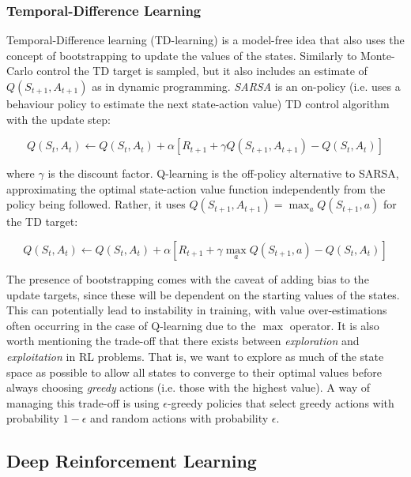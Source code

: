 \documentclass[12pt,twoside]{report}
\begin{document}
\subsubsection{Temporal-Difference Learning}

Temporal-Difference learning (TD-learning) is a model-free idea that also uses the concept of bootstrapping to update the values of the states. Similarly to Monte-Carlo control the TD target is sampled, but it also includes an estimate of $Q(S_{t+1},A_{t+1})$ as in dynamic programming. \textit{SARSA} \cite{sarsa} is an on-policy (i.e. uses a behaviour policy to estimate the next state-action value) TD control algorithm with the update step: 

\begin{equation}
    Q(S_t,A_t) \longleftarrow Q(S_t,A_t) + \alpha \left[R_{t+1} + \gamma Q(S_{t+1},A_{t+1}) - Q(S_t,A_t)\right]
\end{equation}

\noindent where $\gamma$ is the discount factor. Q-learning \cite{q-learning} is the off-policy alternative to SARSA, approximating the optimal state-action value function independently from the policy being followed. Rather, it uses $Q(S_{t+1},A_{t+1}) = \max_a Q(S_{t+1},a)$ for the TD target: 

\begin{equation}
    Q(S_t,A_t) \longleftarrow Q(S_t,A_t) + \alpha \left[R_{t+1} + \gamma \max_a Q(S_{t+1},a) - Q(S_t,A_t)\right]
\end{equation}

The presence of bootstrapping comes with the caveat of adding bias to the update targets, since these will be dependent on the starting values of the states. This can potentially lead to instability in training, with value over-estimations often occurring in the case of Q-learning due to the $\max$ operator. It is also worth mentioning the trade-off that there exists between \textit{exploration} and \textit{exploitation} in RL problems. That is, we want to explore as much of the state space as possible to allow all states to converge to their optimal values before always choosing \textit{greedy} actions (i.e. those with the highest value). A way of managing this trade-off is using $\epsilon$-greedy policies that select greedy actions with probability $1- \epsilon$ and random actions with probability $\epsilon$. 

\subsection{Deep Reinforcement Learning}
\end{document}
